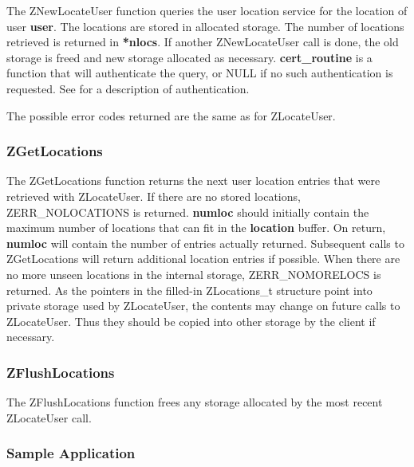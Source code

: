 The ZNewLocateUser function queries the user location service for the
location of user {\bf user}.  The locations are stored in allocated
storage.  The number of locations retrieved is returned in {\bf
*nlocs}.  If another ZNewLocateUser call is done, the old storage is
freed and new storage allocated as necessary.  {\bf cert_routine} is a
function that will authenticate the query, or NULL if no such
authentication is requested.  See  for a
description of authentication.

The possible error codes returned are the same as for ZLocateUser.

\subsubsection{ZGetLocations}
\label{ZGetLocations}

\etemplate
{}

The ZGetLocations function returns the next user location entries that
were retrieved with ZLocateUser.  If there are no stored locations,
ZERR_NOLOCATIONS is returned.  {\bf *numloc} should initially contain
the maximum number of locations that can fit in the {\bf location}
buffer.  On return, {\bf *numloc} will contain the number of entries
actually returned.  Subsequent calls to ZGetLocations will return
additional location entries if possible.  When there are no more unseen
locations in the internal storage, ZERR_NOMORELOCS is returned.  As the
pointers in the filled-in ZLocations_t structure point into private
storage used by ZLocateUser, the contents may change on future calls to
ZLocateUser.  Thus they should be copied into other storage by the
client if necessary.

\subsubsection{ZFlushLocations}
\label{ZFlushLocations}

\etemplate
{}

The ZFlushLocations function frees any storage allocated by the
most recent ZLocateUser call.

\subsubsection{Sample Application}

